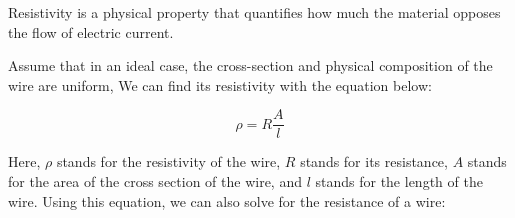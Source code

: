 \graphicspath{ {./} }

Resistivity is a physical property that quantifies how much the material opposes the flow of electric current.

Assume that in an ideal case, the cross-section and physical composition of the wire are uniform, We can find its resistivity with the equation below:

$$\rho = R \frac{A}{l}$$

Here, $\rho$ stands for the resistivity of the wire, $R$ stands for its resistance, $A$ stands for the area of the cross section of the wire, and $l$ stands for the length of the wire. Using this equation, we can also solve for the resistance of a wire:


